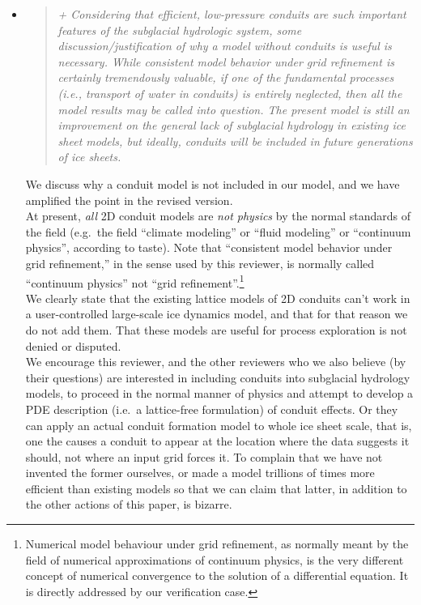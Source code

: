 \documentclass[11pt,reqno]{amsart}
\newcommand{\reply}[2]{
\medskip\medskip
\item  \begin{quote}
\emph{#1}
\end{quote}

\medskip
\noindent #2}
\begin{document}
\begin{itemize}
\reply{+ Considering that efficient, low-pressure conduits are such important features of the
subglacial hydrologic system, some discussion/justification of why a model without conduits is useful is necessary.  While consistent model behavior under grid refinement is
certainly tremendously valuable, if one of the fundamental processes (i.e., transport of
water in conduits) is entirely neglected, then all the model results may be called into
question.  The present model is still an improvement on the general lack of subglacial
hydrology in existing ice sheet models, but ideally, conduits will be included in future
generations of ice sheets.}
{We discuss why a conduit model is not included in our model, and we have amplified the point in the revised version.\\
\indent  At present, \emph{all} 2D conduit models are \emph{not physics} by the normal standards of the field (e.g.~the field ``climate modeling'' or ``fluid modeling'' or ``continuum physics'', according to taste).  Note that ``consistent model behavior under grid refinement,'' in the sense used by this reviewer, is normally called ``continuum physics'' not ``grid refinement''.\footnote{Numerical model behaviour under grid refinement, as normally meant by the field of numerical approximations of continuum physics, is the very different concept of numerical convergence to the solution of a differential equation.  It is directly addressed by our verification case.} \\
\indent We clearly state that the existing lattice models of 2D conduits can't work in a user-controlled large-scale ice dynamics model, and that for that reason we do not add them.  That these models are useful for process exploration is not denied or disputed.\\
\indent We encourage this reviewer, and the other reviewers who we also believe (by their questions) are interested in including conduits into subglacial hydrology models, to proceed in the normal manner of physics and attempt to develop a PDE description (i.e.~a lattice-free formulation) of conduit effects.  Or they can apply an actual conduit formation model to whole ice sheet scale, that is, one the causes a conduit to appear at the location where the data suggests it should, not where an input grid forces it.  To complain that we have not invented the former ourselves, or made a model trillions of times more efficient than existing models so that we can claim that latter, in addition to the other actions of this paper, is bizarre.\\
}
\end{itemize}
\end{document}

